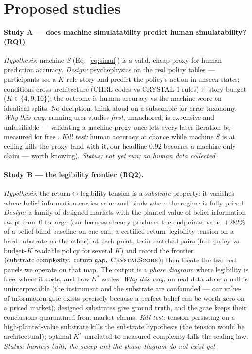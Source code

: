 \documentclass[11pt]{article}
\begin{document}
\section{Proposed studies}
\label{sec:studies}

\paragraph{Study A --- does machine simulatability predict human simulatability? (RQ1)}
\emph{Hypothesis:} machine $S$ (Eq.~\ref{eq:simul}) is a valid, cheap proxy for human
prediction accuracy. \emph{Design:} psychophysics on the real policy tables --- participants
see a $K$-rule story and predict the policy's action in unseen states; conditions cross
architecture (CHRL codes vs CRYSTAL-1 rules) $\times$ story budget
($K \in \{4, 9, 16\}$); the outcome is human accuracy vs the machine score on identical
splits. No deception; think-aloud on a subsample for error taxonomy. \emph{Why this way:}
running user studies \emph{first}, unanchored, is expensive and unfalsifiable --- validating a
machine proxy once lets every later iteration be measured for free
\citep{doshivelez2017,hoffman2018}. \emph{Kill test:} human accuracy at chance while machine
$S$ is at ceiling kills the proxy (and with it, our headline $0.92$ becomes a machine-only
claim --- worth knowing). \emph{Status: not yet run; no human data collected.}

\paragraph{Study B --- the legibility frontier (RQ2).}
\emph{Hypothesis:} the return$\leftrightarrow$legibility tension is a \emph{substrate}
property: it vanishes where belief information carries value and binds where the regime is
fully priced. \emph{Design:} a family of designed markets with the planted value of belief
information swept from $0$ to large (our harness already produces the endpoints: value
$+282\%$ of a belief-blind baseline on one end; a certified return--legibility tension on a
hard substrate on the other); at each point, train matched pairs (free policy vs
budget-$K$ readable policy for several $K$) and record the frontier
$(\text{substrate complexity},\ \text{return gap},\ \textsc{CrystalScore})$; then locate the
two real panels we operate on that map. The output is a \emph{phase diagram}: where
legibility is free, where it costs, and how $K^{*}$ scales. \emph{Why this way:} on real data
alone a null is uninterpretable (the instrument and the substrate are confounded --- our
value-of-information gate exists precisely because a perfect belief can be worth zero on a
priced market); designed substrates give ground truth, and the gate keeps their conclusions
quarantined from market claims. \emph{Kill test:} tension persisting on a high-planted-value
substrate kills the substrate hypothesis (the tension would be architectural); optimal $K^{*}$
unrelated to measured complexity kills the scaling law. \emph{Status: harness built; the sweep
and the phase diagram do not exist yet.}
\end{document}
